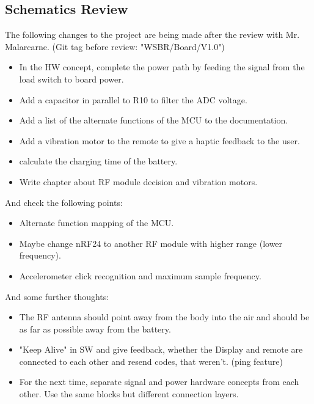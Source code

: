 \subsection{Schematics Review}
 \label{ssec:Remote Schematics Review}
 The following changes to the project are being made after the review with Mr. Malarcarne. (Git tag before review: "WSBR/Board/V1.0")
 \begin{itemize}
     \item In the HW concept, complete the power path by feeding the signal from the load switch to board power.
     \item Add a capacitor in parallel to R10 to filter the ADC voltage.
     \item Add a list of the alternate functions of the MCU to the documentation.
     \item Add a vibration motor to the remote to give a haptic feedback to the user.
     \item calculate the charging time of the battery.
     \item Write chapter about RF module decision and vibration motors.
 \end{itemize}

 And check the following points:
 \begin{itemize}
     \item Alternate function mapping of the MCU.
     \item Maybe change nRF24 to another RF module with higher range (lower frequency).
     \item Accelerometer click recognition and maximum sample frequency.
 \end{itemize}

 And some further thoughts:
 \begin{itemize}
     \item The RF antenna should point away from the body into the air and should be as far as possible away from the battery.
     \item "Keep Alive" in SW and give feedback, whether the Display and remote are connected to each other and resend codes, that weren't. (ping feature)
     \item For the next time, separate signal and power hardware concepts from each other. Use the same blocks but different connection layers.
 \end{itemize}